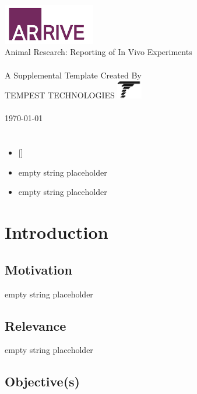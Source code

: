 \documentclass{article}%
\begin{document}
%
\normalsize%

        \pagestyle{plain}
        \thispagestyle{empty}
        \makebox[0pt][r]{\rule{.3\textwidth}{1.5pt}}
        \\[.5in]
        \large{\\
        \includegraphics[width=4cm]{arrivelogo.png}\\
        Animal Research: Reporting of In Vivo Experiments 
        } 
        \\[.5in]
        \makebox[0pt][l]{\rule{1.3\textwidth}{1.5pt}}
        \\[4.5in]
        A Supplemental Template Created By\\
        TEMPEST TECHNOLOGIES \includegraphics[width=.5cm]{logopic.png}\\
        \\[.5in]
        \today
        \newpage
\section{}%
\label{sec:}%
\begin{itemize}%
\item%
{[}{]}%
\item%
empty string placeholder%
\item%
empty string placeholder%
\end{itemize}

%
\section{Introduction}%
\label{sec:Introduction}%
\subsection{Motivation}%
\label{subsec:Motivation}%
empty string placeholder

%
\subsection{Relevance}%
\label{subsec:Relevance}%
empty string placeholder

%
\subsection{Objective(s)}%
\label{subsec:Objective(s)}%
\end{document}
